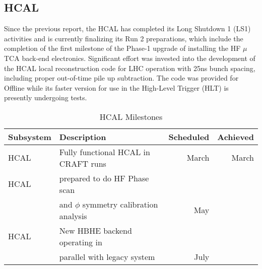 \documentclass[12pt]{article}
\begin{document}
\subsection{HCAL}
Since the previous report, the HCAL has completed its Long Shutdown 1 (LS1)  activities and is currently finalizing its Run 2 preparations, which include the completion of the first milestone of the Phase-1 upgrade of installing the HF  $\mu$TCA back-end electronics. Significant effort was invested into the development of the HCAL local reconstruction code for LHC operation with 25ns bunch spacing, including proper out-of-time pile up subtraction. The code was provided for Offline while its faster version for use in the High-Level Trigger (HLT) is presently undergoing tests.
\begin{table}[htdp]
\caption{HCAL Milestones}
\begin{center}
\begin{tabular}{|l|l|r|r|}
\hline
Subsystem&Description&Scheduled&Achieved\\
\hline
HCAL& Fully functional HCAL in CRAFT runs & March & March\\
\hline
HCAL& prepared to do HF Phase scan & &\\
&and $\phi$ symmetry calibration analysis& May& \\
\hline
HCAL&New HBHE backend operating in& &\\
& parallel with legacy system& July &\\
\hline
\end{tabular}
\end{center}
\label{HCALMilestones}
\end{table}%
\end{document}
